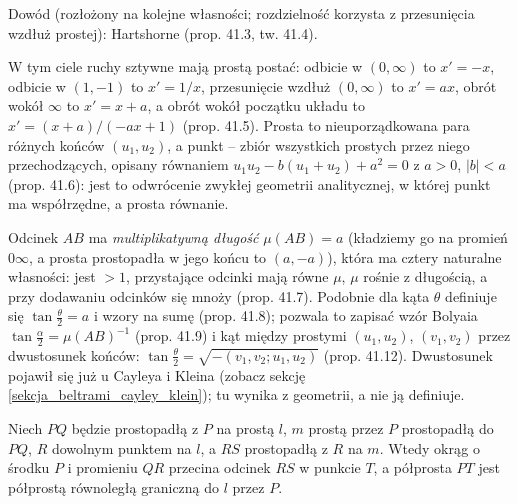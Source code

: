 Dowód (rozłożony na kolejne własności; rozdzielność korzysta z przesunięcia wzdłuż prostej): Hartshorne \cite[s. 390--392]{hartshorne_2000} (prop. 41.3, tw. 41.4). %

W tym ciele ruchy sztywne mają prostą postać: odbicie w $(0,\infty)$ to $x' = -x$, odbicie w $(1,-1)$ to $x' = 1/x$, przesunięcie wzdłuż $(0,\infty)$ to $x' = ax$, obrót wokół $\infty$ to $x' = x + a$, a obrót wokół początku układu to $x' = (x+a)/(-ax+1)$ \cite[s. 392--393]{hartshorne_2000} (prop. 41.5). %
Prosta to nieuporządkowana para różnych końców $(u_1, u_2)$, a punkt -- zbiór wszystkich prostych przez niego przechodzących, opisany równaniem $u_1u_2 - b(u_1+u_2) + a^2 = 0$ z $a > 0$, $|b| < a$ \cite[s. 394]{hartshorne_2000} (prop. 41.6): jest to odwrócenie zwykłej geometrii analitycznej, w której punkt ma współrzędne, a prosta równanie. %

Odcinek $AB$ ma \emph{multiplikatywną długość} $\mu(AB) = a$ (kładziemy go na promień $0\infty$, a prosta prostopadła w jego końcu to $(a, -a)$), która ma cztery naturalne własności: jest $> 1$, przystające odcinki mają równe $\mu$, $\mu$ rośnie z długością, a przy dodawaniu odcinków się mnoży \cite[s. 394--395]{hartshorne_2000} (prop. 41.7). %
Podobnie dla kąta $\theta$ definiuje się $\tan\tfrac{\theta}{2} = a$ i wzory na sumę \cite[s. 395--396]{hartshorne_2000} (prop. 41.8); pozwala to zapisać wzór Bolyaia $\tan\tfrac{\alpha}{2} = \mu(AB)^{-1}$ \cite[s. 396]{hartshorne_2000} (prop. 41.9) i kąt między prostymi $(u_1,u_2)$, $(v_1,v_2)$ przez dwustosunek końców: $\tan\tfrac{\theta}{2} = \sqrt{-(v_1,v_2;u_1,u_2)}$ \cite[s. 399]{hartshorne_2000} (prop. 41.12). %
Dwustosunek pojawił się już u Cayleya i Kleina (zobacz sekcję \ref{sekcja_beltrami_cayley_klein}); tu wynika z geometrii, a nie ją definiuje. %

\begin{theorem}
	Niech $PQ$ będzie prostopadłą z $P$ na prostą $l$, $m$ prostą przez $P$ prostopadłą do $PQ$, $R$ dowolnym punktem na $l$, a $RS$ prostopadłą z $R$ na $m$. %
	Wtedy okrąg o środku $P$ i promieniu $QR$ przecina odcinek $RS$ w punkcie $T$, a półprosta $PT$ jest półprostą równoległą graniczną do $l$ przez $P$. %
\end{theorem}

